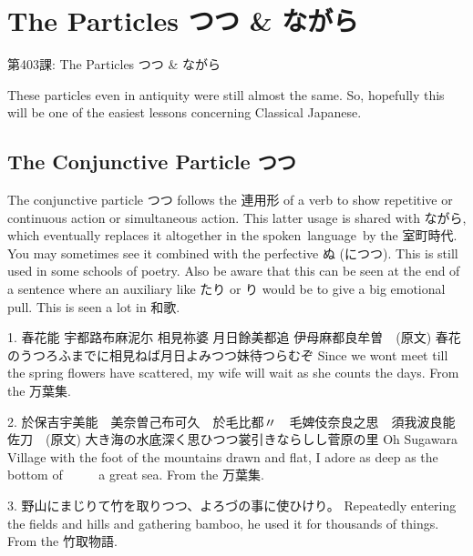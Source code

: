     
\chapter{The Particles つつ \& ながら}

\begin{center}
\begin{Large}
第403課: The Particles つつ \& ながら  
\end{Large}
\end{center}
 
\par{ These particles even in antiquity were still almost the same. So, hopefully this will be one of the easiest lessons concerning Classical Japanese. }
      
\section{The Conjunctive Particle つつ}
 
\par{ The conjunctive particle つつ follows the 連用形 of a verb to show repetitive or continuous action or simultaneous action. This latter usage is shared with ながら, which eventually replaces it altogether in the spoken language by the 室町時代. You may sometimes see it combined with the perfective ぬ (につつ). This is still used in some schools of poetry. Also be aware that this can be seen at the end of a sentence where an auxiliary like たり or り would be to give a big emotional pull. This is seen a lot in 和歌. }

\par{1. 春花能 宇都路布麻泥尓 相見祢婆 月日餘美都追 伊母麻都良牟曽　(原文) \hfill\break
春花のうつろふまでに相見ねば月日よみつつ妹待つらむぞ \hfill\break
Since we won\textquotesingle t meet till the spring flowers have scattered, my wife will wait as she counts the days. \hfill\break
From the 万葉集. }

\par{2. 於保吉宇美能　美奈曽己布可久　於毛比都〃　毛婢伎奈良之思　須我波良能佐刀　(原文) \hfill\break
大き海の水底深く思ひつつ裳引きならしし菅原の里 \hfill\break
Oh Sugawara Village with the foot of the mountains drawn and flat, I adore as deep as the bottom of       a great sea. \hfill\break
From the 万葉集. }

\par{3. 野山にまじりて竹を取りつつ、よろづの事に使ひけり。 \hfill\break
Repeatedly entering the fields and hills and gathering bamboo, he used it for thousands of things. \hfill\break
From the 竹取物語. }

